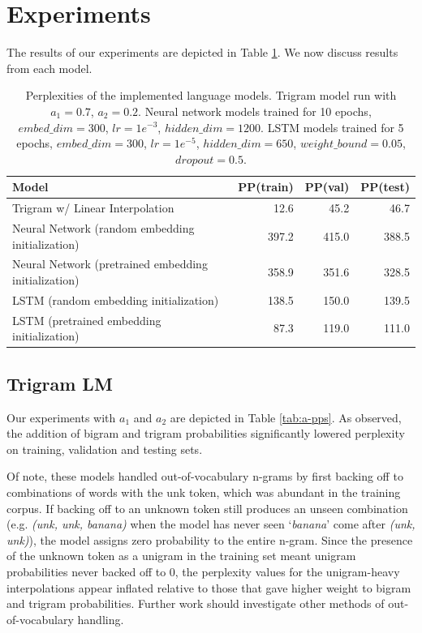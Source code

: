\documentclass[11pt]{article}
\begin{document}
\section{Experiments}

The results of our experiments are depicted in Table \ref{tab:perplexities}. We now discuss results from each model.

\begin{table}[h]
  \centering
  \begin{tabular}{@{}lrrr@{}}
  \toprule
  \textbf{Model} & \textbf{PP(train)} & \textbf{PP(val)} & \textbf{PP(test)} \\ \midrule
  Trigram w/ Linear Interpolation & 12.6 & 45.2 & 46.7 \\
  Neural Network (random embedding initialization) & 397.2 & 415.0 & 388.5 \\ 
  Neural Network (pretrained embedding initialization) & 358.9 & 351.6 & 328.5 \\ 
  LSTM (random embedding initialization) & 138.5 & 150.0 & 139.5 \\ 
  LSTM (pretrained embedding initialization) & 87.3 & 119.0 & 111.0 \\ 
  \bottomrule
  \end{tabular}
  \caption{Perplexities of the implemented language models. Trigram model run with $a_1=0.7$, $a_2=0.2$. Neural network models trained for 10 epochs, $embed\_dim=300$, $lr=1e^{-3}$, $hidden\_dim=1200$. LSTM models trained for 5 epochs, $embed\_dim=300$, $lr=1e^{-5}$, $hidden\_dim=650$, $weight\_bound=0.05$, $dropout=0.5$.}
  \label{tab:perplexities}
\end{table}

\subsection{Trigram LM}

Our experiments with $a_1$ and $a_2$ are depicted in Table \ref{tab:a-pps}. As observed, the addition of bigram and trigram probabilities significantly lowered perplexity on training, validation and testing sets. 

Of note, these models handled out-of-vocabulary n-grams by first backing off to combinations of words with the unk token, which was abundant in the training corpus. If backing off to an unknown token still produces an unseen combination (e.g. \textit{(unk, unk, banana)} when the model has never seen `\textit{banana}' come after \textit{(unk, unk)}), the model assigns zero probability to the entire n-gram. Since the presence of the unknown token as a unigram in the training set meant unigram probabilities never backed off to 0, the perplexity values for the unigram-heavy interpolations appear inflated relative to those that gave higher weight to bigram and trigram probabilities. Further work should investigate other methods of out-of-vocabulary handling.
\end{document}
